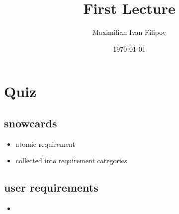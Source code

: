 \documentclass[11pt]{article}
\author{Maximilian Ivan Filipov}
\date{\today}
\title{First Lecture}
\begin{document}
\maketitle
\tableofcontents



\section{Quiz}
\label{sec:org320224d}
\vspace*{0.5cm}
\subsection{snowcards}
\label{sec:org733b81b}
\begin{itemize}
\item atomic requirement
\item collected into requirement categories
\end{itemize}
\subsection{user requirements}
\label{sec:org58b1fd0}
\begin{itemize}
\item 
\end{itemize}
\end{document}
